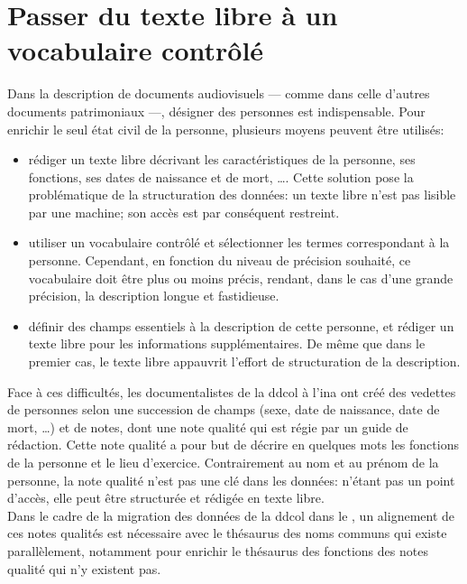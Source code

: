 \section[Passer du texte libre à un vocabulaire contrôlé: aligner des notes qualité et un thésaurus de noms communs]{\label{I-C-3}Passer du texte libre à un vocabulaire contrôlé}

Dans la description de documents audiovisuels --- comme dans celle d'autres documents patrimoniaux ---, désigner des personnes est indispensable. Pour enrichir le seul état civil de la personne, plusieurs moyens peuvent être utilisés:
\begin{itemize}
	\item rédiger un texte libre décrivant les caractéristiques de la personne, ses fonctions, ses dates de naissance et de mort, \dots. Cette solution pose la problématique de la structuration des données: un texte libre n'est pas lisible par une machine; son accès est par conséquent restreint.
	\item utiliser un vocabulaire contrôlé et sélectionner les termes correspondant à la personne. Cependant, en fonction du niveau de précision souhaité, ce vocabulaire doit être plus ou moins précis, rendant, dans le cas d'une grande précision, la description longue et fastidieuse.
	\item définir des champs essentiels à la description de cette personne, et rédiger un texte libre pour les informations supplémentaires. De même que dans le premier cas, le texte libre appauvrit l'effort de structuration de la description.
\end{itemize}
Face à ces difficultés, les documentalistes de la \ac{ddcol} à l'\ac{ina} ont créé des vedettes de personnes selon une succession de champs (sexe, date de naissance, date de mort, \dots) et de notes, dont une note qualité qui est régie par un guide de rédaction. Cette note qualité a pour but de décrire en quelques mots les fonctions de la personne et le lieu d'exercice. Contrairement au nom et au prénom de la personne, la note qualité n'est pas une clé dans les données: n'étant pas un point d'accès, elle peut être structurée et rédigée en texte libre.\\

Dans le cadre de la migration des données de la \ac{ddcol} dans le \ldd, un alignement de ces notes qualités est nécessaire avec le thésaurus des noms communs qui existe parallèlement, notamment pour enrichir le thésaurus des fonctions des notes qualité qui n'y existent pas.

